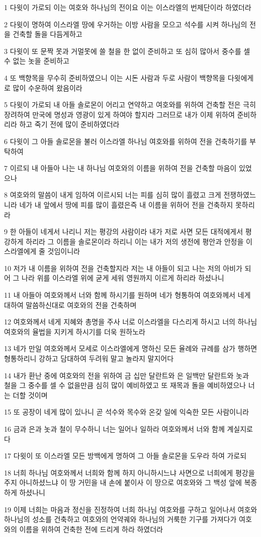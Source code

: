 \par 1 다윗이 가로되 이는 여호와 하나님의 전이요 이는 이스라엘의 번제단이라 하였더라
\par 2 다윗이 명하여 이스라엘 땅에 우거하는 이방 사람을 모으고 석수를 시켜 하나님의 전을 건축할 돌을 다듬게하고
\par 3 다윗이 또 문짝 못과 거멀못에 쓸 철을 한 없이 준비하고 또 심히 많아서 중수를 셀 수 없는 놋을 준비하고
\par 4 또 백향목을 무수히 준비하였으니 이는 시돈 사람과 두로 사람이 백향목을 다윗에게로 많이 수운하여 왔음이라
\par 5 다윗이 가로되 내 아들 솔로몬이 어리고 연약하고 여호와를 위하여 건축할 전은 극히 장려하여 만국에 명성과 영광이 있게 하여야 할지라 그러므로 내가 이제 위하여 준비하리라 하고 죽기 전에 많이 준비하였더라
\par 6 다윗이 그 아들 솔로몬을 불러 이스라엘 하나님 여호와를 위하여 전을 건축하기를 부탁하여
\par 7 이르되 내 아들아 나는 내 하나님 여호와의 이름을 위하여 전을 건축할 마음이 있었으나
\par 8 여호와의 말씀이 내게 임하여 이르시되 너는 피를 심히 많이 흘렸고 크게 전쟁하였느니라 네가 내 앞에서 땅에 피를 많이 흘렸은즉 내 이름을 위하어 전을 건축하지 못하리라
\par 9 한 아들이 네게서 나리니 저는 평강의 사람이라 내가 저로 사면 모든 대적에게서 평강하게 하리라 그 이름을 솔로몬이라 하리니 이는 내가 저의 생전에 평안과 안정을 이스라엘에게 줄 것임이니라
\par 10 저가 내 이름을 위하여 전을 건축할지라 저는 내 아들이 되고 나는 저의 아비가 되어 그 나라 위를 이스라엘 위에 굳게 세워 영원까지 이르게 하리라 하셨나니
\par 11 내 아들아 여호와께서 너와 함께 하시기를 원하며 네가 형통하여 여호와께서 네게 대하여 말씀하신대로 여호와의 전을 건축하며
\par 12 여호와께서 네게 지혜와 총명을 주사 너로 이스라엘을 다스리게 하시고 너의 하나님 여호와의 율법을 지키게 하시기를 더욱 원하노라
\par 13 네가 만일 여호와께서 모세로 이스라엘에게 명하신 모든 율례와 규례를 삼가 행하면 형통하리니 강하고 담대하여 두려워 말고 놀라지 말지어다
\par 14 내가 환난 중에 여호와의 전을 위하여 금 십만 달란트와 은 일백만 달란트와 놋과 철을 그 중수를 셀 수 없을만큼 심히 많이 예비하였고 또 재목과 돌을 예비하였으나 너는 더할 것이며
\par 15 또 공장이 네게 많이 있나니 곧 석수와 목수와 온갖 일에 익숙한 모든 사람이니라
\par 16 금과 은과 놋과 철이 무수하니 너는 일어나 일하라 여호와께서 너와 함께 계실지로다
\par 17 다윗이 또 이스라엘 모든 방백에게 명하여 그 아들 솔로몬을 도우라 하여 가로되
\par 18 너희 하나님 여호와께서 너희와 함께 하지 아니하시느냐 사면으로 너희에게 평강을 주지 아니하셨느냐 이 땅 거민을 내 손에 붙이사 이 땅으로 여호와와 그 백성 앞에 복종하게 하셨나니
\par 19 이제 너희는 마음과 정신을 진정하여 너희 하나님 여호와를 구하고 일어나서 여호와 하나님의 성소를 건축하고 여호와의 언약궤와 하나님의 거룩한 기구를 가져다가 여호와의 이름을 위하여 건축한 전에 드리게 하라 하였더라

